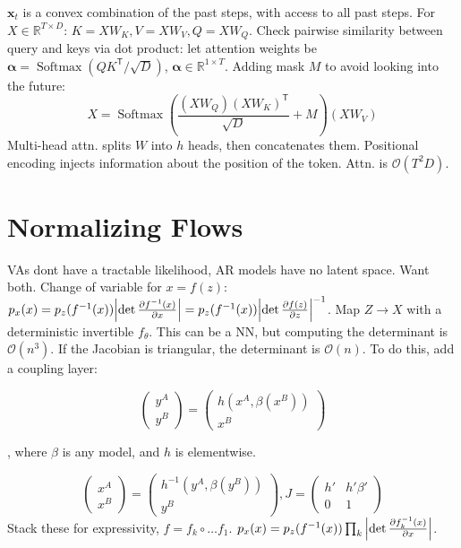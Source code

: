 \documentclass[11pt,landscape,a4paper,fleqn]{article}
\newcommand*{\tran}{^{\mathsf{T}}} %
\DeclareMathOperator{\softmax}{\mathrm{Softmax}}
\newcommand{\R}{\mathbb{R}}
\def\myvector#1{\mathbf{#1}}
\def\vx{{\myvector{x}}}
\begin{document}
\begin{multicols*}{4}
$\vx_t$ is a convex combination of the past steps, with access to all past steps.
For $X \in \R^{T \times D}$: 
$K = XW_K, V = XW_V, Q = XW_Q$.
Check pairwise similarity between query and keys via dot product:
let attention weights be $\bm{\alpha} = \softmax(QK\tran / \sqrt{D})$, $\bm{\alpha} \in \R^{1 \times T}$.
Adding mask $M$ to avoid looking into the future:
\[X = \softmax\left(\frac{(XW_Q)(XW_K)\tran}{\sqrt{D}} + M\right)(XW_V)\]
Multi-head attn. splits $W$ into $h$ heads, then concatenates them.
Positional encoding injects information about the position of the token.
Attn. is $\mathcal{O}(T^2 D)$.

\section{Normalizing Flows}

VAs dont have a tractable likelihood, AR models have no latent space.
Want both.
Change of variable for $x = f(z)$:
$p_x(x) = p_z(f^{-1}(x)) \abs{\det \pdv{f^{-1}(x)}{x}} = p_z(f^{-1}(x)) \abs{\det \pdv{f(z)}{z}}^{-1}$.
Map $Z \to X$ with a deterministic invertible $f_\theta$.
This can be a NN, but computing the determinant is $\mathcal{O}(n^3)$.
If the Jacobian is triangular, the determinant is $\mathcal{O}(n)$.
To do this, add a coupling layer:
\begin{minipage}{0.5\linewidth}
    \[\begin{pmatrix}
        y^A \\
        y^B
    \end{pmatrix} = \begin{pmatrix}
        h(x^A, \beta(x^B)) \\
        x^B
    \end{pmatrix}\]
\end{minipage}%
\hspace{0.3cm}%
\begin{minipage}{0.45\linewidth}
    , where $\beta$ is any model, and $h$ is elementwise.
\end{minipage}
\[\begin{pmatrix}
    x^A \\
    x^B
\end{pmatrix} = \begin{pmatrix}
    h^{-1}(y^A, \beta(y^B)) \\
    y^B
\end{pmatrix}, J = \begin{pmatrix}
    h' & h'\beta' \\
    0 & 1
\end{pmatrix}\]
Stack these for expressivity, $f = f_k \circ \dots f_1$.
$p_x(x) = p_z(f^{-1}(x)) \prod_k \abs{\det \pdv{f_k^{-1}(x)}{x}}$.


\end{multicols*}
\end{document}
